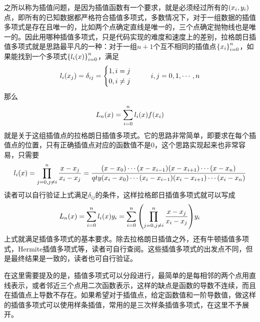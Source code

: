 \documentclass[12pt,a4paper,openany,twoside]{book}
\numberwithin{equation}{section}
\begin{document}
          之所以称为插值问题，是因为插值函数有一个要求，就是必须经过所有的$\qty(x_i,y_i)$点，即所有的已知数据都严格符合插值多项式，多数情况下，对于一组数据的插值多项式是存在且唯一的，比如两个点确定直线是唯一的，三个点确定抛物线也是唯一的。因此用哪种插值多项式，只是代码实现的难度和速度上的差别，拉格朗日插值多项式就是思路最平凡的一种：对于一组$n+1$个互不相同的插值点$\qty{x_i}_{i=0}^n$，如果能找到一个多项式$\qty{l_{i}\qty(x)}_{i=0}^{n}$，满足
          \begin{equation}
            l_{i}\qty(x_{j})=\delta_{i j}=\begin{cases}
              1,i=j \\
              0,i\neq j 
            \end{cases}\ \ \ \ \ i,j=0,1,\cdots,n
          \end{equation}
          那么
          \begin{equation}
            L_{n}\qty(x)=\sum_{i=0}^{n}{l_{i}\qty(x)f\qty(x_{i})}
          \end{equation}
          就是关于这组插值点的拉格朗日插值多项式。它的思路非常简单，即要求在每个插值点的位置，只有正确插值点对应的函数值不是0，这个思路实现起来也非常容易，只需要
          \begin{equation}
            l_{i}(x)=\prod_{j=0,j\neq i}^n{\frac{x-x_j}{x_i-x_j}}=\frac{\qty(x-x_0)\cdots\qty(x-x_{i-1})\qty(x-x_{i+1})\cdots\qty(x-x_{n})}{qty(x_{i}-x_0)\cdots\qty(x_i-x_{i-1})\qty(x_i-x_{i+1})\cdots\qty(x_i-x_{n})}
          \end{equation}
          读者可以自行验证上式满足$\delta_{ij}$的条件，这样拉格郎日插值多项式就可以写成
          \begin{equation}
            L_{n}\qty(x)=\sum_{i=0}^n{l_{i}\qty(x)y_i}=\sum_{i=0}^{n}{\qty(\prod_{j=0,j\neq i}^n \frac{x-x_j}{x_i-x_j})y_i}
          \end{equation}
          上式就满足插值多项式的基本要求。除去拉格朗日插值之外，还有牛顿插值多项式，Hermite插值多项式等，读者可自行查阅。这些插值多项式的出发点不同，但是最终结果是一致的，读者也可自行验证。
          
          在这里需要提及的是，插值多项式可以分段进行，最简单的是每相邻的两个点用直线表示，或者邻近三个点用二次函数表示，这样的缺点是函数的导数不连续，而且在插值点上导数不存在。如果希望对于插值点，给定函数值和一阶导数值，做这样的插值多项式可以使用样条插值，常用的是三次样条插值多项式，在这里不予展开。
\end{document}
